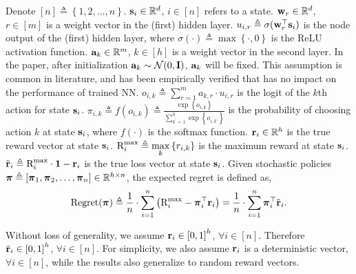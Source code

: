 Denote $[n] \triangleq \left\{ 1,2, \dots, n \right\}$. ${\mathbf{s}}_i \in {\mathbb{R}}^d$, $i \in [n]$ refers to a state. ${\mathbf{w}}_r \in {\mathbb{R}}^d$, $r \in [m]$ is a weight vector in the (first) hidden layer. $u_{i,r} \triangleq \sigma({\mathbf{w}}_r^\top {\mathbf{s}}_i)$ is the node output of the (first) hidden layer, where $\sigma(\cdot) \triangleq \max\left\{ \cdot, 0 \right\}$ is the ReLU activation function. ${\mathbf{a}}_k \in {\mathbb{R}}^m$, $k \in [h]$ is a weight vector in the second layer. In the paper, after initialization ${\mathbf{a}}_k \sim {\mathcal{N}}(0, {\mathbf{I}})$, ${\mathbf{a}}_k$ will be fixed. This assumption is common in literature, and has been empirically verified that has no impact on the performance of trained NN. $o_{i,k} \triangleq \sum\limits_{r=1}^{m}{a_{k,r} \cdot u_{i,r}}$ is the logit of the $k$th action for state ${\mathbf{s}}_i$. $\pi_{i,k} \triangleq f\left( o_{i,k} \right) \triangleq \frac{\exp\left\{ o_{i,k} \right\}}{\sum\limits_{k^\prime = 1}^{h}{\exp\left\{ o_{i,k^\prime} \right\}}}$ is the probability of choosing action $k$ at state ${\mathbf{s}}_i$, where $f(\cdot)$ is the softmax function. ${\mathbf{r}}_i \in {\mathbb{R}}^h$ is the true reward vector at state ${\mathbf{s}}_i$. ${\text{R}}_i^{\max} \triangleq \max\limits_{k}\left\{ r_{i,k} \right\}$ is the maximum reward at state ${\mathbf{s}}_i$. ${\tilde{\mathbf{r}}}_i \triangleq {\text{R}}_i^{\max} \cdot {\mathbf{1}} - {\mathbf{r}}_i$ is the true loss vector at state ${\mathbf{s}}_i$. Given stochastic policies ${\boldsymbol{\pi}} \triangleq \left[ {\boldsymbol{\pi}}_1, {\boldsymbol{\pi}}_2, \dots, {\boldsymbol{\pi}}_n \right] \in {\mathbb{R}}^{h \times n}$, the expected regret is defined as,
\begin{equation*}
\begin{split}
    {\text{Regret}}({\boldsymbol{\pi}}) \triangleq \frac{1}{n} \cdot \sum\limits_{i=1}^{n}{ \left( {\text{R}}_i^{\max} - {\boldsymbol{\pi}}_i^\top {\mathbf{r}}_i \right) } = \frac{1}{n} \cdot \sum\limits_{i=1}^{n}{ {\boldsymbol{\pi}}_{i}^\top {\tilde{\mathbf{r}}}_{i} }.
\end{split}
\end{equation*}

Without loss of generality, we assume ${\mathbf{r}}_i \in \left[ 0, 1 \right]^h$, $\forall i \in [n]$. Therefore ${\tilde{\mathbf{r}}}_i \in \left[ 0, 1 \right]^h$, $\forall i \in [n]$. For simplicity, we also assume ${\mathbf{r}}_i$ is a deterministic vector, $\forall i \in [n]$, while the results also generalize to random reward vectors.